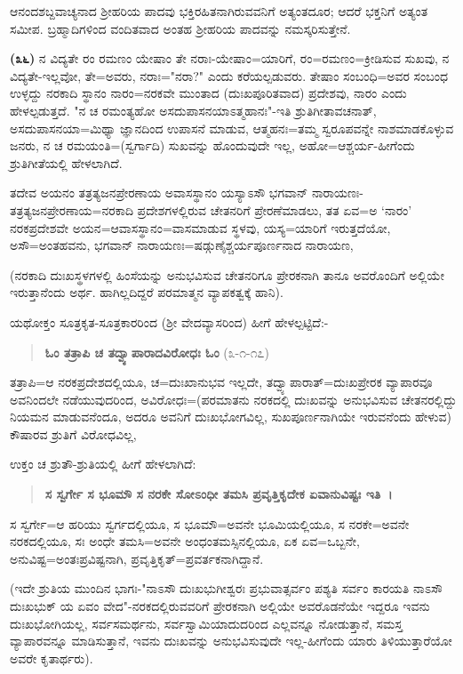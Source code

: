 
ಆನಂದಶಬ್ದವಾಚ್ಯನಾದ ಶ‍್ರೀಹರಿಯ ಪಾದವು ಭಕ್ತಿರಹಿತನಾಗಿರುವವನಿಗೆ ಅತ್ಯಂತದೂರ; ಆದರೆ ಭಕ್ತನಿಗೆ ಅತ್ಯಂತ ಸಮೀಪ. ಬ್ರಹ್ಮಾದಿಗಳಿಂದ ವಂದಿತವಾದ ಅಂತಹ ಶ‍್ರೀಹರಿಯ ಪಾದವನ್ನು ನಮಸ್ಕರಿಸುತ್ತೇನೆ.

\textbf{(೩೬)} ನ ವಿದ್ಯತೇ ರಂ ರಮಣಂ ಯೇಷಾಂ ತೇ ನರಾಃ-ಯೇಷಾಂ=ಯಾರಿಗೆ, ರಂ=ರಮಣಂ=ಕ್ರೀಡಿಸುವ ಸುಖವು, ನ ವಿದ್ಯತೇ-ಇಲ್ಲವೋ, ತೇ=ಅವರು, ನರಾಃ="ನರಾ?" ಎಂದು ಕರೆಯಲ್ಪಡುವರು. ತೇಷಾಂ ಸಂಬಂಧಿ=ಅವರ ಸಂಬಂಧ ಉಳ್ಳದ್ದು ನರಕಾದಿ ಸ್ಥಾನಂ ನಾರಂ=ನರಕವೇ ಮುಂತಾದ (ದುಃಖಪೂರಿತವಾದ) ಪ್ರದೇಶವು, ನಾರಂ ಎಂದು ಹೇಳಲ್ಪಡುತ್ತದೆ. "ನ ಚ ರಮಂತ್ಯಹೋ ಅಸದುಪಾಸನಯಾಽತ್ಮಹಾನಃ"-ಇತಿ ಶ್ರುತಿಗೀತಾವಚನಾತ್, ಅಸದುಪಾಸನಯಾ=ಮಿಥ್ಯಾ ಜ್ಞಾನದಿಂದ ಉಪಾಸನೆ ಮಾಡುವ, ಆತ್ಮಹನಃ=ತಮ್ಮ ಸ್ವರೂಪವನ್ನೇ ನಾಶಮಾಡಕೊಳ್ಳುವ ಜನರು, ನ ಚ ರಮಯಂತಿ=(ಸ್ವರ್ಗಾದಿ) ಸುಖವನ್ನು ಹೊಂದುವುದೇ ಇಲ್ಲ, ಅಹೋ=ಆಶ್ಚರ್ಯ-ಹೀಗೆಂದು ಶ್ರುತಿಗೀತೆಯಲ್ಲಿ ಹೇಳಲಾಗಿದೆ.

ತದೇವ ಅಯನಂ ತತ್ರತ್ಯಜನಪ್ರೇರಣಾಯ ಅವಾಸಸ್ಥಾನಂ ಯಸ್ಯಾಽಸೌ ಭಗವಾನ್ ನಾರಾಯಣಃ-ತತ್ರತ್ಯಜನಪ್ರೇರಣಾಯ=ನರಕಾದಿ ಪ್ರದೇಶಗಳಲ್ಲಿರುವ ಚೇತನರಿಗೆ ಪ್ರೇರಣೆಮಾಡಲು, ತತ ಏವ=ಅ `ನಾರಂ' ನರಕಪ್ರದೇಶವೇ ಅಯನ=ಆವಾಸಸ್ಥಾನಂ=ವಾಸಮಾಡುವ ಸ್ಥಳವು, ಯಸ್ಯ=ಯಾರಿಗೆ ಇರುತ್ತದೆಯೋ, ಅಸೌ=ಅಂತಹವನು, ಭಗವಾನ್ ನಾರಾಯಣಃ=\-ಷಡ್ಗುಣೈಶ್ಚರ್ಯಪೂರ್ಣನಾದ ನಾರಾಯಣ,

(ನರಕಾದಿ ದುಃಖಸ್ಥಳಗಳಲ್ಲಿ ಹಿಂಸೆಯನ್ನು ಅನುಭವಿಸುವ ಚೇತನರಿಗೂ ಪ್ರೇರಕನಾಗಿ ತಾನೂ ಅವರೊಂದಿಗೆ ಅಲ್ಲಿಯೇ ಇರುತ್ತಾನೆಂದು ಅರ್ಥ. ಹಾಗಿಲ್ಲದಿದ್ದರೆ ಪರಮಾತ್ಮನ ವ್ಯಾಪಕತ್ವಕ್ಕೆ ಹಾನಿ).

ಯಥೋಕ್ತಂ ಸೂತ್ರಕೃತ-ಸೂತ್ರಕಾರರಿಂದ (ಶ‍್ರೀ ವೇದವ್ಯಾಸರಿಂದ) ಹೀಗೆ ಹೇಳಲ್ಪಟ್ಟಿದೆ:-

\begin{verse}
\textbf{ಓಂ ತತ್ರಾಪಿ ಚ ತದ್ವ್ಯಾಪಾರಾದವಿರೋಧಃ ಓಂ} (೩-೧-೧೭)
\end{verse}

ತತ್ರಾಪಿ=ಆ ನರಕಪ್ರದೇಶದಲ್ಲಿಯೂ, ಚ=ದುಃಖಾನುಭವ ಇಲ್ಲದೇ, ತದ್ವ್ಯಾಪಾ\-ರಾತ್=\-ದುಃಖಪ್ರೇರಕ ವ್ಯಾಪಾರವೂ ಅವನಿಂದಲೇ ನಡೆಯುವುದರಿಂದ, ಅವಿರೋಧಃ=(ಪರಮಾತನು ನರಕದಲ್ಲಿ ದುಃಖವನ್ನು ಅನುಭವಿಸುವ ಚೇತನರಲ್ಲಿದ್ದು ನಿಯಮನ ಮಾಡುವನೆಂದೂ, ಅದರೂ ಅವನಿಗೆ ದುಃಖಭೋಗವಿಲ್ಲ, ಸುಖಪೂರ್ಣನಾಗಿಯೇ ಇರುವನೆಂದು ಹೇಳುವ) ಕೌಷಾರವ ಶ್ರುತಿಗೆ ವಿರೋಧವಿಲ್ಲ,

ಉಕ್ತಂ ಚ ಶ್ರುತೌ-ಶ್ರುತಿಯಲ್ಲಿ ಹೀಗೆ ಹೇಳಲಾಗಿದೆ:

\begin{verse}
\textbf{ಸ ಸ್ವರ್ಗೇ ಸ ಭೂಮೌ ಸ ನರಕೇ ಸೋಽಂಧೀ ತಮಸಿ ಪ್ರವೃತ್ತಿಕೃದೇಕ ಏವಾನುವಿಷ್ಟಃ ಇತಿ~।}
\end{verse}


ಸ ಸ್ವರ್ಗೇ=ಆ ಹರಿಯು ಸ್ವರ್ಗದಲ್ಲಿಯೂ, ಸ ಭೂಮೌ=ಅವನೇ ಭೂಮಿಯಲ್ಲಿಯೂ, ಸ ನರಕೇ=ಅವನೇ ನರಕದಲ್ಲಿಯೂ, ಸಃ ಅಂಧೇ ತಮಸಿ=ಅವನೇ ಅಂಧಂತಮಸ್ಸಿನಲ್ಲಿಯೂ, ಏಕ ಏವ=ಒಬ್ಬನೇ, ಅನುವಿಷ್ಟ=ಅಂತಃಪ್ರವಿಷ್ಟನಾಗಿ, ಪ್ರವೃತ್ತಿಕೃತ್=ಪ್ರವರ್ತಕನಾಗಿದ್ದಾನೆ.

(ಇದೇ ಶ್ರುತಿಯ ಮುಂದಿನ ಭಾಗಃ-"ನಾಽಸೌ ದುಃಖಭುಗೀಶ್ವರಃ ಪ್ರಭುವಾತ್ಸರ್ವಂ ಪಶ್ಯತಿ ಸರ್ವಂ ಕಾರಯತಿ ನಾಽಸೌ ದುಃಖಭುಕ್ ಯ ಏವಂ ವೇದ"-ನರಕದಲ್ಲಿರುವವರಿಗೆ ಪ್ರೇರಕನಾಗಿ ಅಲ್ಲಿಯೇ ಅವರೊಡನೆಯೇ ಇದ್ದರೂ ಇವನು ದುಃಖಭೋಗಿಯಲ್ಲ, ಸರ್ವಸಮರ್ಥನು, ಸರ್ವಸ್ವಾಮಿಯಾದುದರಿಂದ ಎಲ್ಲವನ್ನೂ ನೋಡುತ್ತಾನೆ, ಸಮಸ್ತ ವ್ಯಾಪಾರವನ್ನೂ ಮಾಡಿಸುತ್ತಾನೆ, ಇವನು ದುಃಖವನ್ನು ಅನುಭವಿಸುವುದೇ ಇಲ್ಲ-ಹೀಗೆಂದು ಯಾರು ತಿಳಿಯುತ್ತಾರೆಯೋ ಅವರೇ ಕೃತಾರ್ಥರು).


